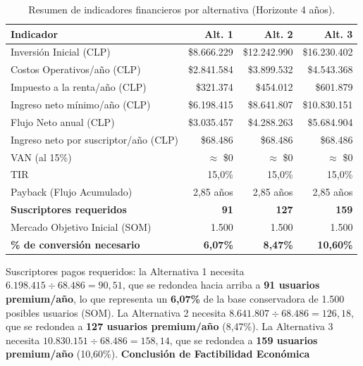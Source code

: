\begin{table}[h!]
    \centering
    \renewcommand{\arraystretch}{1.5}
    \begin{tabular}{|m{4.5cm}|r|r|r|}
        \hline
        \rowcolor[HTML]{EFEFEF}
        \textbf{Indicador} & \textbf{Alt. 1} & \textbf{Alt. 2} & \textbf{Alt. 3} \\ \hline
        Inversión Inicial (CLP) & \$8.666.229 & \$12.242.990 & \$16.230.402 \\ \hline
        Costos Operativos/año (CLP) & \$2.841.584 & \$3.899.532 & \$4.543.368 \\ \hline
        Impuesto a la renta/año (CLP) & \$321.374 & \$454.012 & \$601.879 \\ \hline
        Ingreso neto mínimo/año (CLP) & \$6.198.415 & \$8.641.807 & \$10.830.151 \\ \hline
        Flujo Neto anual (CLP) & \$3.035.457 & \$4.288.263 & \$5.684.904 \\ \hline
        Ingreso neto por suscriptor/año (CLP) & \$68.486 & \$68.486 & \$68.486 \\ \hline
        VAN (al 15\%) & $\approx$ \$0 & $\approx$ \$0 & $\approx$ \$0 \\ \hline
        TIR & 15,0\% & 15,0\% & 15,0\% \\ \hline
        Payback (Flujo Acumulado) & 2,85 años & 2,85 años & 2,85 años \\ \hline
        \rowcolor[HTML]{E8F5E9}
        \textbf{Suscriptores requeridos} & \textbf{91} & \textbf{127} & \textbf{159} \\ \hline
        Mercado Objetivo Inicial (SOM) & 1.500 & 1.500 & 1.500 \\ \hline
        \rowcolor[HTML]{E8F5E9}
        \textbf{\% de conversión necesario} & \textbf{6,07\%} & \textbf{8,47\%} & \textbf{10,60\%} \\ \hline
    \end{tabular}
    \caption{Resumen de indicadores financieros por alternativa (Horizonte 4 años).}
    \label{tab:resumen_financiero}
\end{table}

Suscriptores pagos requeridos: la Alternativa 1 necesita $6.198.415 \div 68.486 = 90,51$, que se redondea hacia arriba a \textbf{91 usuarios premium/año}, lo que representa un \textbf{6,07\%} de la base conservadora de 1.500 posibles usuarios (SOM). La Alternativa 2 necesita $8.641.807 \div 68.486 = 126,18$, que se redondea a \textbf{127 usuarios premium/año} (8,47\%). La Alternativa 3 necesita $10.830.151 \div 68.486 = 158,14$, que se redondea a \textbf{159 usuarios premium/año} (10,60\%).
\newpage
\textbf{Conclusión de Factibilidad Económica}

